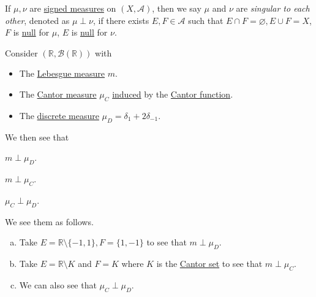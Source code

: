 \begin{definition}[Singular]\label{def:singular}
	If \(\mu,\nu\) are \hyperref[def:signed-measure]{signed measures} on \((X, \mathcal{A})\), then we say \(\mu\) and \(\nu \) are \emph{singular to each other}, denoted as
	\(\mu \perp \nu\), if there exists \(E,F \in \mathcal{A}\) such that \(E \cap F = \varnothing, E \cup F = X\), \(F\) is \hyperref[def:null-set-for-a-signed-measure]{null}
	for \(\mu\), \(E\) is \hyperref[def:null-set-for-a-signed-measure]{null} for \(\nu\).
\end{definition}

\begin{eg}
	Consider \((\mathbb{R}, \mathcal{B}(\mathbb{R}))\) with
	\begin{itemize}
		\item The \hyperref[def:Lebesgue-measure]{Lebesgue measure} \(m\).
		\item The \hyperref[def:Cantor-measure]{Cantor measure} \(\mu_C\) \hyperref[def:Lebesgue-Stieltjes-measure]{induced} by the \hyperref[sssec:Cantor-Function]{Cantor function}.
		\item The \hyperref[eg:discrete-measure]{discrete measure} \(\mu_D = \delta_1 + 2\delta_{-1}\).
	\end{itemize}

	We then see that
	\begin{enumerate*}[(a)]
		\item \(m\perp \mu _D\).
		\item \(m\perp \mu _C\).
		\item \(\mu _C \perp \mu _D\).
	\end{enumerate*}
\end{eg}
\begin{explanation}
	We see them as follows.
	\begin{enumerate}[(a)]
		\item Take \(E = \mathbb{R} \setminus \{-1,1\}, F = \{1,-1\}\) to see that \(m \perp \mu_D\).
		\item Take \(E = \mathbb{R} \setminus K\) and \(F = K\) where \(K\) is the \hyperref[eg:lec8:Cantor-set]{Cantor set} to see that \(m \perp \mu_C\).
		\item We can also see that \(\mu_C \perp \mu_D\).
	\end{enumerate}
\end{explanation}


